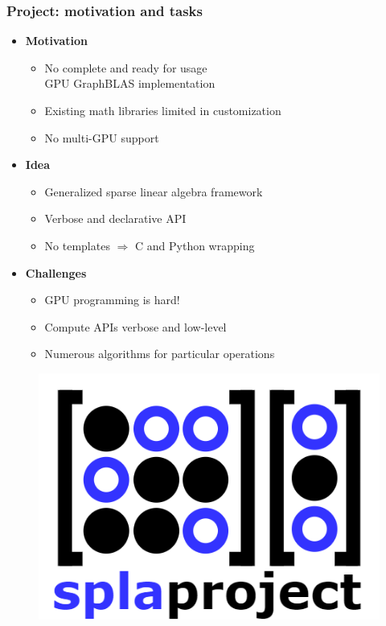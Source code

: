 \documentclass[aspectratio=169,xcolor=table,english]{beamer}
\begin{document}
\begin{frame}[fragile] \frametitle{Project: motivation and tasks}
    \begin{minipage}[m]{0.7\linewidth}
        \begin{itemize}
            \item \textbf{Motivation}
            {
            \begin{itemize}
                \item No complete and ready for usage\\GPU GraphBLAS implementation
                \item Existing math libraries limited in customization
                \item No multi-GPU support
            \end{itemize}
            }
            \item \textbf{Idea}
            {
            \begin{itemize}
                \item Generalized sparse linear algebra framework
                \item Verbose and declarative API
                \item No templates $\Rightarrow$ C and Python wrapping
            \end{itemize}
            }
            \item \textbf{Challenges}
            {
            \begin{itemize}
                \item GPU programming is hard!
                \item Compute APIs verbose and low-level
                \item Numerous algorithms for particular operations
            \end{itemize}
            }
        \end{itemize}
    \end{minipage}\hfill
    \begin{minipage}[m]{0.3\linewidth}
        \begin{figure}
            \centering
            \includegraphics[width=\textwidth]{figures/spla-logo.png}

\end{figure}
\end{minipage}
\end{frame}
\end{document}
